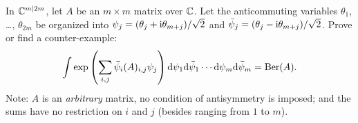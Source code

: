 \begin{exercise}
In $\mathbb{C}^{m|2m}$, let $A$ be an $m\times m$ matrix over $\mathbb{C}$.
Let the anticommuting variables $\theta_{1}$, \dots, $\theta_{2m}$ be
organized into $\psi_{j}=(\theta_{j}+\mathrm{i}\theta_{m+j})/\sqrt{2}$ and $\bar{\psi}_{j} = (\theta_{j} - \mathrm{i}\theta_{m+j})/\sqrt{2}$.
Prove or
find a counter-example:
\begin{equation}
\int\exp\left(\sum_{i,j}\bar{\psi}_{i}(A)_{i,j}\psi_{j}\right)\mathrm{d}\psi_{1}\mathrm{d}\bar{\psi}_{1}\cdots\mathrm{d}\psi_{m}\mathrm{d}\bar{\psi}_{m}=\operatorname{Ber}(A).
\end{equation}
Note: $A$ is an \emph{arbitrary} matrix, no condition of antisymmetry is
imposed; and the sums have no restriction on $i$ and $j$ (besides
ranging from $1$ to $m$).
\end{exercise}

